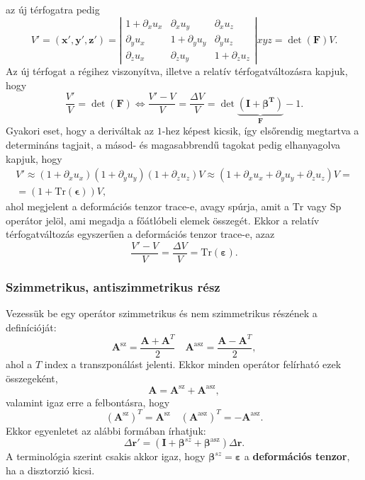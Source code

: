 \documentclass[12pt,a4paper]{scrartcl}
\let\mathbf\bm
\begin{document}
az új térfogatra pedig
\begin{equation*}
  V' = \left( {{\mathbf{x}}',{\mathbf{y}}',{\mathbf{z}}'} \right) = \left| {\begin{array}{*{20}{c}}
  {1 + {\partial _x}{u_x}}&{{\partial _x}{u_y}}&{{\partial _x}{u_z}} \\ 
  {{\partial _y}{u_x}}&{1 + {\partial _y}{u_y}}&{{\partial _y}{u_z}} \\ 
  {{\partial _z}{u_x}}&{{\partial _z}{u_y}}&{1 + {\partial _z}{u_z}} 
\end{array}} \right| x y z  = \det \left( {\mathbf{F}} \right)V. 
\end{equation*}
Az új térfogat a régihez viszonyítva, illetve a relatív térfogatváltozásra kapjuk, hogy
\[\frac{{V'}}{V} = \det \left( {\mathbf{F}} \right) \Leftrightarrow \frac{{V' - V}}{V} = \frac{{\Delta V}}{V} = \det \underbrace {\left( {{\mathbf{I}} + {\mathbf{\beta^T }}} \right)}_{\mathbf{F}} - 1.\]
Gyakori eset, hogy a deriváltak az $1$-hez képest kicsik, így elsőrendig megtartva a determináns tagjait, a másod- és magasabbrendű tagokat pedig elhanyagolva kapjuk, hogy 
\begin{multline*}
  V' \approx \left( {1 + {\partial _x}{u_x}} \right)\left( {1 + {\partial _y}{u_y}} \right)\left( {1 + {\partial _z}{u_z}} \right)V \approx \left( {1 + {\partial _x}{u_x} + {\partial _y}{u_y} + {\partial _z}{u_z}} \right)V =  \\
   = \left( 1+{{\text{Tr}}\left( {\mathbf{\epsilon}} \right)} \right)V,
\end{multline*}
ahol megjelent a deformációs tenzor trace-e, avagy spúrja, amit a ${\text {Tr}}$ vagy ${\text {Sp}}$ operátor jelöl, ami megadja a főátlóbeli elemek összegét. Ekkor a relatív térfogatváltozás egyszerűen a deformációs tenzor trace-e, azaz
\[\frac{{V' - V}}{V} = \frac{{\Delta V}}{V} = {\text{Tr}}\left( {\mathbf{\varepsilon }} \right).\]

\subsubsection{Szimmetrikus, antiszimmetrikus rész}
Vezessük be egy operátor szimmetrikus és nem szimmetrikus részének a definícióját:
\[{{\mathbf{A}}^{{\text{sz}}}} = \frac{{{\mathbf{A}} + {{\mathbf{A}}^T}}}{2}\quad {{\mathbf{A}}^{\text{asz}}} = \frac{{{\mathbf{A}} - {{\mathbf{A}}^T}}}{2},\]
ahol a $T$ index a transzponálást jelenti. Ekkor minden operátor felírható ezek összegeként,
\[{\mathbf{A}} = {{\mathbf{A}}^{{\text{sz}}}} + {{\mathbf{A}}^{{\text{asz}}}},\]
valamint igaz erre a felbontásra, hogy \[{\left( {{{\mathbf{A}}^{{\text{sz}}}}} \right)^T} = {{\mathbf{A}}^{\text{sz}}}\quad {\left( {{{\mathbf{A}}^{{\text{asz}}}}} \right)^T} =  - {{\mathbf{A}}^{{\text{asz}}}}.\]
Ekkor \az{\eqref{eq:disztrozio_def}} egyenletet az alábbi formában írhatjuk:
\[\Delta {\mathbf{r}}' = \left( {{\mathbf{I}} + {{\mathbf{\beta }}^{sz}} + {{\mathbf{\beta }}^{{\text{asz}}}}} \right)\Delta {\mathbf{r}}.\] A terminológia szerint csakis akkor igaz, hogy ${{\mathbf{\beta }}^{sz}} = {\mathbf{\varepsilon }}$ a \textbf{deformációs tenzor}, ha a disztorzió kicsi.
\end{document}

